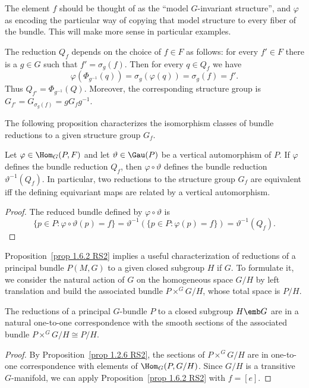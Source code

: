 The element $f$ should be thought of as the ``model $G$-invariant structure'', and $\varphi$ as encoding the particular way of copying that model structure to every fiber of the bundle. This will make more sense in particular examples.

\begin{rem}[{{\cite[Rem.~1.6.3]{RS2}}}]
    The reduction $Q_f$ depends on the choice of $f\in F$ as follows: for every $f'\in F$ there is a $g\in G$ such that $f'=\sigma_g(f)$. Then for every $q\in Q_f$ we have
    \[\varphi(\Phi_{g^{-1}}(q))=\sigma_g(\varphi(q))=\sigma_g(f)=f'.\]
    Thus $Q_{f'}=\Phi_{g^{-1}}(Q)$. Moreover, the corresponding structure group is $G_{f'}=G_{\sigma_g(f)}=gG_fg^{-1}$.
\end{rem}


The following proposition characterizes the isomorphism classes of bundle reductions to a given structure group $G_f$.

\begin{prop}[{{\cite[Prop.~1.6.4]{RS2}}}]\label{prop 1.6.4 RS2}
    Let $\varphi\in \Hom_G(P,F)$ and let $\vartheta\in\Gau(P)$ be a vertical automorphism of $P$. If $\varphi$ defines the bundle reduction $Q_f$, then $\varphi\circ\vartheta$ defines the bundle reduction $\vartheta^{-1}(Q_f)$. In particular, two reductions to the structure group $G_f$ are equivalent iff the defining equivariant maps are related by a vertical automorphism.
\end{prop}
\begin{proof}
    The reduced bundle defined by $\varphi\circ\vartheta$ is
    \[\{p\in P:\varphi\circ\vartheta(p)=f\}=\vartheta^{-1}\left(\{p\in P:\varphi(p)=f\}\right)=\vartheta^{-1}(Q_f).\]
\end{proof}

Proposition~\ref{prop 1.6.2 RS2} implies a useful characterization of reductions of a principal bundle $P(M,G)$ to a given closed subgroup $H$ if $G$. To formulate it, we consider the natural action of $G$ on the homogeneous space $G\slash H$ by left translation and build the associated bundle $P\times^G G\slash H$, whose total space is $P\slash H$.

\begin{cor}[{{\cite[Cor.~1.6.5]{RS2}}}]\label{cor 1.6.5 RS2}
    The reductions of a principal $G$-bundle $P$ to a closed subgroup $H\emb G$ are in a natural one-to-one correspondence with the smooth sections of the associated bundle $P\times^G G\slash H\cong P\slash H$.
\end{cor}
\begin{proof}
    By Proposition~\ref{prop 1.2.6 RS2}, the sections of $P\times^G G\slash H$ are in one-to-one correspondence with elements of $\Hom_G(P,G\slash H)$. Since $G\slash H$ is a transitive $G$-manifold, we can apply Proposition~\ref{prop 1.6.2 RS2} with $f=[e]$.
\end{proof}

